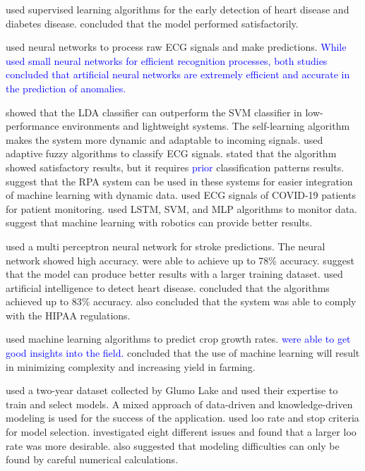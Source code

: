 \documentclass[a4paper,fleqn]{cas-dc}
\newcommand{\responsemodsm}[1]{\textcolor{blue}{#1}}
\begin{document}
\cite*{ref_paper_m2} used supervised learning algorithms for the early detection of heart disease and diabetes disease. \cite*{ref_paper_m2} concluded that the model performed satisfactorily.

\cite*{09_rp} used neural networks to process raw ECG signals and make predictions. \responsemodsm{While \cite*{22_rp} used small neural networks for efficient recognition processes, both studies concluded that artificial neural networks are extremely efficient and accurate in the prediction of anomalies.}

\cite*{06_rp} showed that the LDA classifier can outperform the SVM classifier in low-performance environments and lightweight systems. The self-learning algorithm makes the system more dynamic and adaptable to incoming signals. \cite*{14_rp} used adaptive fuzzy algorithms to classify ECG signals. \citeauthor{14_rp} stated that the algorithm showed satisfactory results, but it requires \responsemodsm{prior} classification patterns results. \cite*{ref_paper_self_rpa} suggest that the RPA system can be used in these systems for easier integration of machine learning with dynamic data. \cite*{21_rp} used ECG signals of COVID-19 patients for patient monitoring. \citeauthor{21_rp} used LSTM, SVM, and MLP algorithms to monitor data. \citeauthor{21_rp} suggest that machine learning with robotics can provide better results.

\cite*{07_rp} used a multi perceptron neural network for stroke predictions. The neural network showed high accuracy. \citeauthor{07_rp} were able to achieve up to 78\% accuracy. \citeauthor{07_rp} suggest that the model can produce better results with a larger training dataset. \cite*{05_rp} used artificial intelligence to detect heart disease. \citeauthor{05_rp} concluded that the algorithms achieved up to 83\% accuracy. \citeauthor{05_rp} also concluded that the system was able to comply with the HIPAA regulations.

\cite*{ref_paper_m3} used machine learning algorithms to predict crop growth rates. \responsemodsm{\citeauthor{ref_paper_m3} were able to get good insights into the field.} \citeauthor{ref_paper_m3} concluded that the use of machine learning will result in minimizing complexity and increasing yield in farming.

\cite*{01_rp} used a two-year dataset collected by Glumo Lake and used their expertise to train and select models. A mixed approach of data-driven and knowledge-driven modeling is used for the success of the application. \cite*{13_rp} used loo rate and stop criteria for model selection. \citeauthor{13_rp} investigated eight different issues and found that a larger loo rate was more desirable. \citeauthor{13_rp} also suggested that modeling difficulties can only be found by careful numerical calculations.
\end{document}
